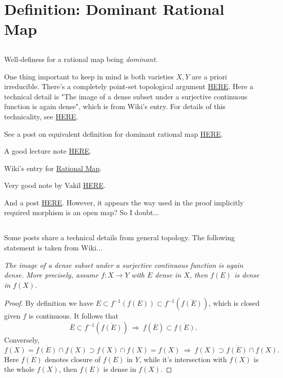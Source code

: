 \section{Definition: Dominant Rational Map}

\subsection{}
Well-definess for a rational map being \textit{dominant}.

One thing important to keep in mind is both varieties $X,Y$ are a priori irreducible. There's a completely point-set topological argument \href{https://math.stackexchange.com/questions/182037/dominant-rational-maps}{HERE}. Here a technical detail is "The image of a dense subset under a surjective continuous function is again dense", which is from Wiki's entry. For details of this technicality, see \href{https://math.stackexchange.com/questions/3452534/image-of-a-dense-set-via-a-continuous-surjective-function-is-dense}{HERE}.

See a post on equivalent definition for dominant rational map \href{https://math.stackexchange.com/questions/2557825/equivalent-definitions-of-dominant-rational-map}{HERE}.

A good lecture note \href{https://math.mit.edu/~mckernan/Teaching/09-10/Autumn/18.725/l_14.pdf}{HERE}.

Wiki's entry for \href{https://en.wikipedia.org/wiki/Rational_mapping}{Rational Map}.

Very good note by Vakil \href{https://math.stanford.edu/~vakil/725/class13.pdf}{HERE}.

And a post \href{https://math.stackexchange.com/questions/1843113/how-is-a-dominant-rational-map-well-defined}{HERE}. However, it appears the way used in the proof implicitly required morphism is an open map? So I doubt...

\subsection{}
Some posts share a technical details from general topology. The following statement is taken from Wiki... 

\textit{The image of a dense subset under a surjective continuous function is again dense. More precisely, assume $f:X\to Y$ with $E$ dense in $X$, then $f(E)$ is dense in $f(X)$.}

\begin{proof}
    By definition we have $E\subset f^{-1}(f(E))\subset f^{-1}(\overline{f(E)})$, which is closed given $f$ is continuous. 
    It follows that \[\overline{E}\subset f^{-1}(\overline{f(E)}) ~\Rightarrow~ f(\overline{E})\subset \overline{f(E)}.\]
    Conversely,
    \[f(X)=\overline{f(E)}\cap f(X)\supset f(X)\cap f(X)=f(X) ~\Rightarrow~ f(X)\supset \overline{f(E)}\cap f(X).\]
    Here $\overline{f(E)}$ denotes closure of $f(E)$ in $Y$, while it's intersection with $f(X)$ is the whole $f(X)$, then $f(E)$ is dense in $f(X)$. 
\end{proof}

